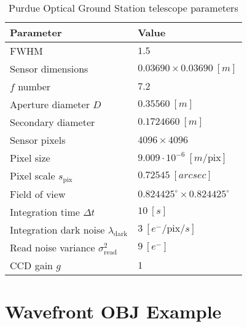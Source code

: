 \begin{table}[ht]
    \centering
    \caption{Purdue Optical Ground Station telescope parameters}
    \vspace*{6pt}
    \begin{tabular}{|l|l|}
    \hline
    \textbf{Parameter} & \textbf{Value} \\ \hline
    FWHM                & $1.5$                              \\ \hline
    Sensor dimensions    & $ 0.03690 \times 0.03690 \: [m]$                               \\ \hline
    $f$ number   & $7.2$                              \\ \hline
    Aperture diameter $D$       & $0.35560 \: [m]$                              \\ \hline
    Secondary diameter         & $0.1724660 \: [m]$                              \\ \hline
    Sensor pixels               & $4096 \times 4096$                              \\ \hline
    Pixel size               & $9.009 \cdot 10^{-6} \: [m / \textrm{pix}]$                              \\ \hline
    Pixel scale $s_\mathrm{pix}$              & $0.72545 \: [arcsec]$                              \\ \hline
    Field of view               & $0.824425^\circ \times 0.824425^\circ$                              \\ \hline
    Integration time $\Delta t$              & $10 \: [s]$                              \\ \hline
    Integration dark noise $\lambda_\mathrm{dark}$ & $3 \: \left[ e^- / \mathrm{pix} / s\right]$ \\ \hline
    Read noise variance $\sigma_\mathrm{read}^2$ & $9 \: \left[ e^- \right]$ \\ \hline
    CCD gain $g$ & $1$ \\ \hline
    \end{tabular}
    \label{tb:pogs_parameters}
  \end{table}

\clearpage
\section{Wavefront OBJ Example} \label{sec:obj_listing}

\begin{listing}[ht]
    \inputminted[breaklines=true, breakanywhere=true, breaksymbol=\hspace{0pt}, fontsize=\scriptsize]{text}{/Users/liamrobinson/Documents/PyLightCurves/mirage/resources/models/cube.obj}
\end{listing}